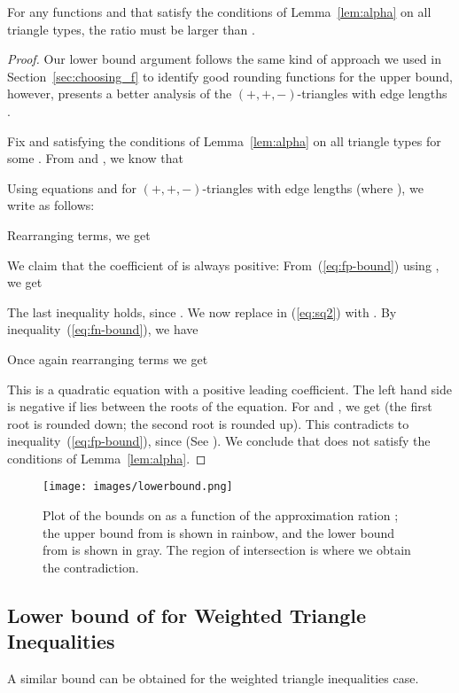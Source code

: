 \documentclass[11pt]{article}
\theoremstyle{definition}
\theoremstyle{remark}
\newcommand{\ppm}{\ensuremath{(+,+,-)}}
\begin{document}
\begin{theorem}\label{thm:limitation-complete}
For any functions  and  that satisfy the conditions of
Lemma~\ref{lem:alpha} on all triangle types, the ratio  must be larger than .
\end{theorem}
\begin{proof}
Our lower bound argument follows the same kind of approach we used in Section~\ref{sec:choosing_f} to identify good rounding functions for the upper bound, however, presents a better analysis of the \ppm-triangles with edge lengths .

Fix  and  satisfying the conditions of Lemma~\ref{lem:alpha} on all triangle types
for some . From  and , we know that

Using equations  and  
for \ppm-triangles with edge lengths  (where ),
we write  as follows:

Rearranging terms, we get

We claim that the coefficient  of  is always
positive: From~(\ref{eq:fp-bound}) using , we get

The last inequality holds, since .
We now replace  in (\ref{eq:sq2}) with .
By inequality~(\ref{eq:fn-bound}), we have

Once again rearranging terms we get

This is a quadratic equation with a positive leading coefficient. The left hand side
is negative if  lies between the roots of the equation.  For  and , we get  (the first root is rounded down; the second root is rounded up). This contradicts to inequality~(\ref{eq:fp-bound}), since  (See ).
We conclude that  does not satisfy the conditions of Lemma~\ref{lem:alpha}.
\end{proof}

\begin{figure}
\centering
\texttt{[image: images/lowerbound.png]}
\caption{Plot of the bounds on  as a function of the
  approximation ration ; the upper bound from  is shown in rainbow, and the lower bound from  is shown in gray. The region of intersection is where we obtain the contradiction.}
\label{fig:lb}
\end{figure}

\subsection{\texorpdfstring{Lower bound of  for Weighted Triangle Inequalities}{Lower bound of 1.5 for Weighted Triangle Inequalities}}
A similar bound can be obtained for the weighted triangle inequalities
case.
\end{document}
